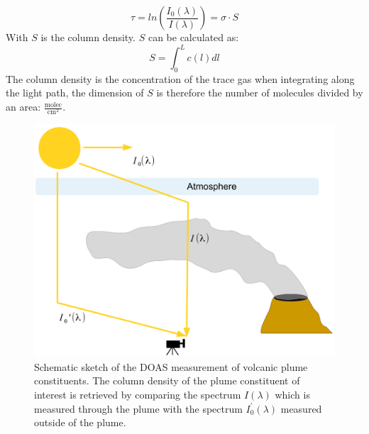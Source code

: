 \documentclass  [
  paper    = a4,
  BCOR     = 10mm,
  twoside,
  fontsize = 12pt,
  fleqn,
  toc      = bibnumbered,
  toc      = listofnumbered,
  numbers  = noendperiod,
  headings = normal,
  listof   = leveldown,
  version  = 3.03
]                                       {scrreprt}
\begin{document}
\begin{equation}
\tau = ln\left(\frac{I_{0}\left(\lambda\right)}{I\left(\lambda\right)}\right) = \sigma\cdot S
\end{equation}
With $S$ is the column density. $S$ can be calculated as:
\begin{equation}
S = \int_{0}^{L}c\left(l\right)dl
\end{equation}
The column density is the concentration of the trace gas when integrating along the light path, the dimension of $S$ is therefore the number of molecules divided by an area: $\frac{\text{molec}}{\text{cm}^2}$.\\
%
\begin{figure}
	\centering
	\includegraphics[width=0.7\linewidth]{Bilder/DOASFunction}
	\caption[Schematic sketch of the DOAS measurement of volcanic plume constituents.]{Schematic sketch of the DOAS measurement of volcanic plume constituents. The column density of the plume constituent of interest is retrieved by comparing the spectrum $I\left(\lambda \right)$ which is measured through the plume with the spectrum  $I_0^{'}\left(\lambda \right)$ measured outside of the plume.}
	\label{fig:doasfunction}
\end{figure}
\end{document}
